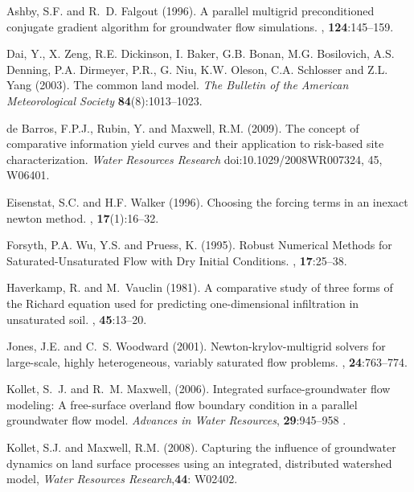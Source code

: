 \begin{thebibliography}{99}

Ashby, S.F. and R.~D. Falgout (1996).
\newblock A parallel multigrid preconditioned conjugate gradient algorithm for
  groundwater flow simulations.
, {\bf 124}:145--159.

Dai, Y., X. Zeng, R.E. Dickinson, I. Baker, G.B. Bonan, M.G. Bosilovich, A.S. Denning, P.A. Dirmeyer, P.R., G. Niu, K.W. Oleson, C.A. Schlosser and Z.L. Yang (2003). The common land model. {\em The Bulletin of the American Meteorological Society} {\bf 84}(8):1013--1023.

de Barros, F.P.J., Rubin, Y. and Maxwell, R.M. (2009). The concept of comparative information yield curves and their application to risk-based site characterization. {\em Water Resources Research} doi:10.1029/2008WR007324, 45, W06401.

Eisenstat, S.C. and H.F. Walker (1996).
\newblock Choosing the forcing terms in an inexact newton method.
, {\bf 17}(1):16--32.

Forsyth, P.A. Wu, Y.S. and Pruess, K. (1995).
\newblock Robust Numerical Methods for Saturated-Unsaturated Flow with Dry Initial Conditions.
, {\bf 17}:25--38.

Haverkamp, R. and M.~Vauclin (1981).
\newblock A comparative study of three forms of the {R}ichard equation used for
  predicting one-dimensional infiltration in unsaturated soil.
, {\bf 45}:13--20.


Jones, J.E. and C.~S. Woodward (2001).
\newblock Newton-krylov-multigrid solvers for large-scale, highly heterogeneous, variably saturated flow problems.
, {\bf 24}:763--774.

Kollet, S.~J. and R.~M. Maxwell, (2006). Integrated
surface-groundwater flow
  modeling: A free-surface overland flow boundary condition in a parallel
  groundwater flow model. {\em Advances in Water Resources}, {\bf 29}:945--958 .

Kollet, S.J. and Maxwell, R.M. (2008). Capturing the influence of groundwater dynamics on land surface processes using an integrated, distributed watershed model, { \em Water Resources Research},{\bf 44}: W02402.


\end{thebibliography}

